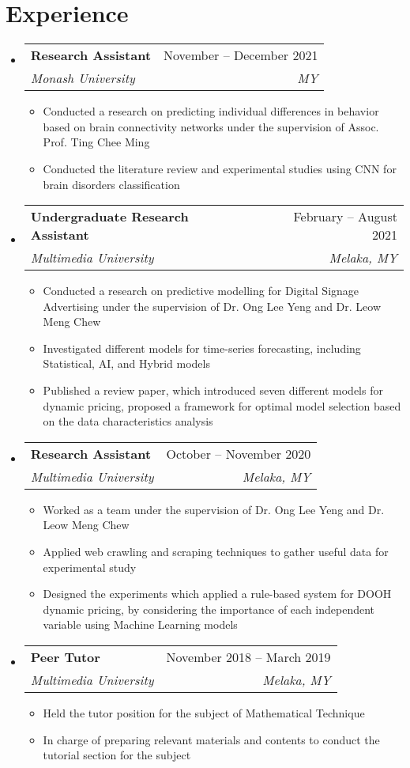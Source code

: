 \documentclass[a4,10pt]{article}
\makeatletter
\newcommand{\resumeItem}[1]{
  \item\small{
    {#1 \vspace{-2pt}}
  }
}
\newcommand{\resumeSubheading}[4]{
  \vspace{-2pt}\item
    \begin{tabular*}{0.97\textwidth}[t]{l@{\extracolsep{\fill}}r}
      \textbf{#1} & #2 \\
      \textit{\small#3} & \textit{\small #4} \\
    \end{tabular*}\vspace{-7pt}
}
\newcommand{\resumeSubHeadingListStart}{\begin{itemize}[leftmargin=0.15in, label={}]}
\newcommand{\resumeSubHeadingListEnd}{\end{itemize}}
\newcommand{\resumeItemListStart}{\begin{itemize}}
\newcommand{\resumeItemListEnd}{\end{itemize}\vspace{-5pt}}
\makeatother
\begin{document}
\section{Experience}
  \resumeSubHeadingListStart
    \resumeSubheading
      {Research Assistant}{November -- December 2021}
      {Monash University}{MY}
      \resumeItemListStart
        \resumeItem{Conducted a research on predicting individual differences in behavior based on brain connectivity networks under the supervision of Assoc. Prof. Ting Chee Ming}
	\resumeItem{Conducted the literature review and experimental studies using CNN for brain disorders classification}
      \resumeItemListEnd
      
    \resumeSubheading
      {Undergraduate Research Assistant}{February -- August 2021}
      {Multimedia University}{Melaka, MY}
      \resumeItemListStart
        \resumeItem{Conducted a research on predictive modelling for Digital Signage Advertising under the supervision of Dr. Ong Lee Yeng and Dr. Leow Meng Chew}
        \resumeItem{Investigated different models for time-series forecasting, including Statistical, AI, and Hybrid models}
	\resumeItem{Published a review paper, which introduced seven different models for dynamic pricing, proposed a framework for optimal model selection based on the data characteristics analysis}
      \resumeItemListEnd
      

      \resumeSubheading
      {Research Assistant}{October -- November 2020}
      {Multimedia University}{Melaka, MY}
      \resumeItemListStart
        \resumeItem{Worked as a team under the supervision of Dr. Ong Lee Yeng and Dr. Leow Meng Chew}
        \resumeItem{Applied web crawling and scraping techniques to gather useful data for experimental study}
        \resumeItem{Designed the experiments which applied a rule-based system for DOOH dynamic pricing, by considering the importance of each independent variable using Machine Learning models}
      \resumeItemListEnd
    
    \resumeSubheading
      {Peer Tutor}{November 2018 -- March 2019}
      {Multimedia University}{Melaka, MY}
      \resumeItemListStart
        \resumeItem{Held the tutor position for the subject of Mathematical Technique}
        \resumeItem{In charge of preparing relevant materials and contents to conduct the tutorial section for the subject}
    \resumeItemListEnd

  \resumeSubHeadingListEnd


\end{document}
